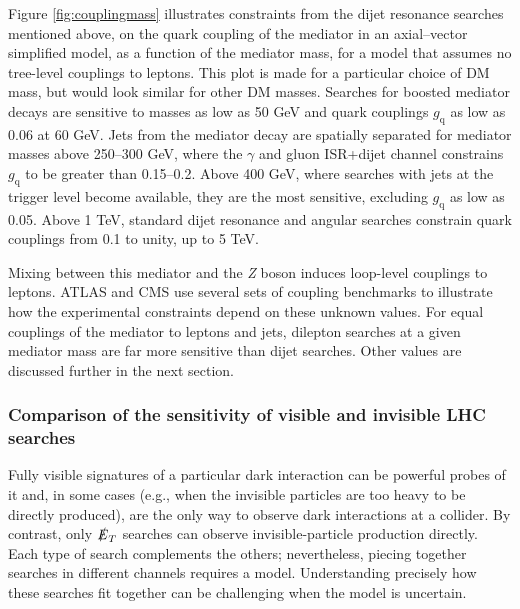 \documentclass{ar-1col}
\newcommand{\IP}{invisible particle}
\newcommand{\gq}{$g_{\mathrm{q}}$\xspace}
\newcommand{\MET}{\ensuremath{\slashed{E}_T}\xspace}
\begin{document}
{Figure \ref{fig:couplingmass} illustrates constraints from the
dijet resonance searches mentioned above, on the quark coupling of
the mediator in an axial--vector simplified model, as a function of
the mediator mass, for a model that assumes no tree-level
couplings to leptons. This plot is made for a particular choice of DM mass, 
but would look similar for other DM masses. 
Searches for boosted mediator decays are sensitive to masses as low as 50 GeV
and quark couplings \gq as low as 0.06 at 60 GeV. Jets from the
mediator decay are spatially separated for mediator masses above
250--300 GeV, where the $\gamma$ and gluon ISR+dijet channel
constrains \gq to be greater than 0.15--0.2. Above 400 GeV, where searches with
jets at the trigger level become available, they are the most
sensitive, excluding \gq as low as 0.05. Above 1 TeV, standard
dijet resonance and angular searches constrain quark couplings
from 0.1 to unity, up to 5 TeV.

Mixing between this mediator and the \textit{Z} boson induces loop-level
couplings to leptons. ATLAS and CMS use several sets of coupling
benchmarks to illustrate how the experimental constraints depend
on these unknown values. For equal couplings of the mediator to
leptons and jets, dilepton searches at a given mediator mass are
far more sensitive than dijet searches. Other values are
discussed further in the next section.

\subsubsection{Comparison of the sensitivity of visible and invisible LHC searches}\label{sub:comparisonVisibleInvisible}

Fully visible signatures of a particular dark interaction can be
powerful probes of it and, in some cases (e.g., when the {\IP}s
are too heavy to be directly produced), are the only way to observe
dark interactions at a collider. By contrast, only \MET
searches can observe invisible-particle production directly.
Each type of search complements the others; nevertheless, piecing
together searches in different channels requires a model.
Understanding precisely how these searches fit together can be
challenging when the model is uncertain.

}
\end{document}
